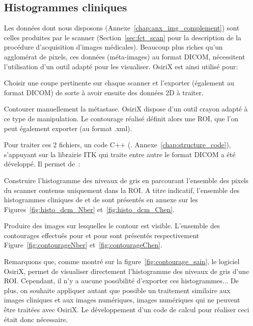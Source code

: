 \documentclass[main.tex]{subfiles}
\begin{document}
\subsection{Histogrammes cliniques} 
Les données dont nous disposons (\cf Annexe~\ref{chap:anx_img_complement}) sont celles produites par le scanner (\cf Section~\ref{sec:fct_scan} pour la description de la procédure d'acquisition d'images médicales). Beaucoup plus riches qu'un agglomérat de pixels, ces données (méta-images) au format DICOM, nécessitent l'utilisation d'un outil adapté pour les visualiser. OsiriX est ainsi utilisé pour:
\begin{myitemize}
\item Choisir une coupe pertinente sur chaque scanner et l'exporter (également au format DICOM) de sorte à avoir ensuite des données 2D à traiter.
\item Contourer manuellement la métastase. OsiriX dispose d'un outil crayon adapté à ce type de manipulation. Le contourage réalisé définit alors une ROI, que l'on peut également exporter (au format .xml).
\end{myitemize}
Pour traiter ces 2 fichiers, un code C++ (\cf. Annexe~\ref{chap:structure_code}), s'appuyant sur la librairie ITK qui traite entre autre le format DICOM a été développé. Il permet de~:
\begin{myitemize}
\item Construire l'histogramme des niveaux de gris en parcourant  l'ensemble des pixels du scanner contenus uniquement dans la ROI. 
A titre indicatif, l'ensemble des histogrammes cliniques de \Nber et de \Chen sont présentés en annexe sur les Figures~\ref{fig:histo_dcm_Nber} et~\ref{fig:histo_dcm_Chen}. %
\item Produire des images sur lesquelles le contour est visible. L'ensemble des contourages effectués pour \Nber et pour \Chen sont présentés respectivement Figure~\ref{fig:contourageNber} et~\ref{fig:contourageChen}.
\end{myitemize}


Remarquons que, comme montré sur la figure~\ref{fig:contourage_sain}, le logiciel OsiriX, permet de visualiser directement l'histogramme des niveaux de gris d'une ROI. Cependant, il n'y a aucune possibilité d'exporter ces histogrammes... De plus, on souhaite appliquer autant que possible un traitement similaire aux images cliniques et aux images numériques, images numériques qui ne peuvent être traitées avec OsiriX. Le développement d'un code de calcul pour réaliser ceci était donc nécessaire.
\end{document}
